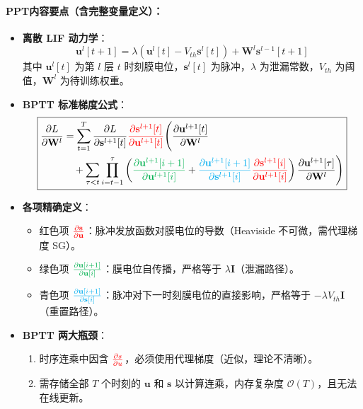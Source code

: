 \documentclass[journal,12pt,onecolumn]{IEEEtran}
\begin{document}
\paragraph{\textbf{PPT内容要点（含完整变量定义）：}}
\begin{itemize}
    \item \textbf{离散 LIF 动力学}：
    \[
    \mathbf{u}^{l}[t+1] = \lambda (\mathbf{u}^{l}[t] - V_{th}\mathbf{s}^{l}[t]) + \mathbf{W}^{l}\mathbf{s}^{l-1}[t+1]
    \]
    其中 \(\mathbf{u}^{l}[t]\) 为第 \(l\) 层 \(t\) 时刻膜电位，\(\mathbf{s}^{l}[t]\) 为脉冲，\(\lambda\) 为泄漏常数，\(V_{th}\) 为阈值，\(\mathbf{W}^{l}\) 为待训练权重。
    
    \item \textbf{BPTT 标准梯度公式}：
    \[
    \boxed{
    \begin{aligned}
    \frac{\partial L}{\partial \mathbf{W}^l}
    &=
    \sum_{t=1}^T
    \frac{\partial L}{\partial \mathbf{s}^{l+1}[t]}
    {\color{red}{\frac{\partial \mathbf{s}^{l+1}[t]}{\partial \mathbf{u}^{l+1}[t]}}}
    \Bigg(
    \frac{\partial \mathbf{u}^{l+1}[t]}{\partial \mathbf{W}^l}
    \\
    &\quad +
    \sum_{\tau < t}
    \prod_{i=t-1}^{\tau}
    \left(
    {\color[rgb]{0,0.69,0.31}{\frac{\partial \mathbf{u}^{l+1}[i+1]}{\partial \mathbf{u}^{l+1}[i]}}}
    +
    {\color{cyan}{\frac{\partial \mathbf{u}^{l+1}[i+1]}{\partial \mathbf{s}^{l+1}[i]}}}
    {\color{red}{\frac{\partial \mathbf{s}^{l+1}[i]}{\partial \mathbf{u}^{l+1}[i]}}}
    \right)
    \frac{\partial \mathbf{u}^{l+1}[\tau]}{\partial \mathbf{W}^l}
    \Bigg)
    \end{aligned}
    }
    \]
    
    \item \textbf{各项精确定义}：
    \begin{itemize}
        \item 红色项 \({\color{red}{\frac{\partial \mathbf{s}}{\partial \mathbf{u}}}}\)：脉冲发放函数对膜电位的导数（Heaviside 不可微，需代理梯度 SG）。
        \item 绿色项 \({\color[rgb]{0,0.69,0.31}{\frac{\partial \mathbf{u}[i+1]}{\partial \mathbf{u}[i]}}}\)：膜电位自传播，严格等于 \(\lambda \mathbf{I}\)（泄漏路径）。
        \item 青色项 \({\color{cyan}{\frac{\partial \mathbf{u}[i+1]}{\partial \mathbf{s}[i]}}}\)：脉冲对下一时刻膜电位的直接影响，严格等于 \(-\lambda V_{th} \mathbf{I}\)（重置路径）。
    \end{itemize}
    
    \item \textbf{BPTT 两大瓶颈}：
    \begin{enumerate}
        \item 时序连乘中因含 \({\color{red}{\frac{\partial s}{\partial u}}}\)，必须使用代理梯度（近似，理论不清晰）。
        \item 需存储全部 \(T\) 个时刻的 \(\mathbf{u}\) 和 \(\mathbf{s}\) 以计算连乘，内存复杂度 \(\mathcal{O}(T)\)，且无法在线更新。
    \end{enumerate}
\end{itemize}
\end{document}
